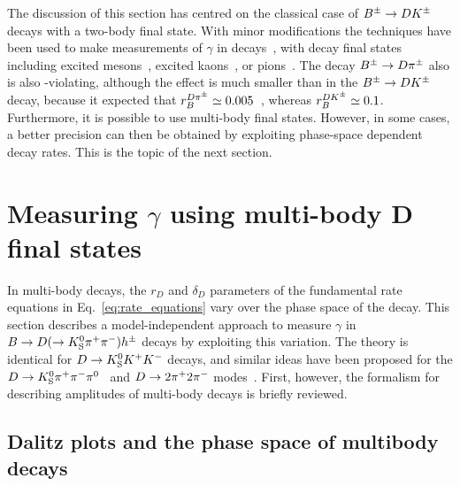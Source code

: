 The discussion of this section has centred on the classical case of ${{B}^\pm}\rightarrow D{{K}^\pm}$ decays with a two-body \D final state. With minor modifications the techniques have been used to make measurements of $\gamma$ in \Bz decays~\cite{altGammeToBeFilledIn}, with \B decay final states including excited \D mesons~\cite{altGammeToBeFilledIn}, excited kaons~\cite{altGammeToBeFilledIn}, or pions~\cite{altGammeToBeFilledIn}. The decay ${{B}^\pm}\rightarrow D {{\pi}^\pm}$ also is also \CP-violating, although the effect is much smaller than in the ${{B}^\pm}\rightarrow D{{K}^\pm}$ decay, because it expected that $r_B^{D\pi^\pm}\simeq 0.005$~\cite{kenzieEstimatingEnsuremathPi2016}, whereas $r_B^{{{D}{{K}^\pm}}}\simeq 0.1$. Furthermore, it is possible to use multi-body \D final states. However, in some cases, a better precision can then be obtained by exploiting phase-space dependent decay rates. This is the topic of the next section.



\section{\texorpdfstring{Measuring $\gamma$ using multi-body D final states}{Measuring gamma using multi-body D final states}} %
\label{sec:gamma_with_multibody_d_final_states}


In multi-body \D decays, the $r_D$ and $\delta_D$ parameters of the fundamental rate equations in Eq.~\eqref{eq:rate_equations} vary over the phase space of the \D decay. This section describes a model-independent approach to measure $\gamma$ in ${B}\rightarrow{\ensuremath{D}}(\rightarrow{\ensuremath{{K}^0_{\mathrm{S}}}}{\ensuremath{{\pi}^+}}{\ensuremath{{\pi}^-}})h^\pm$ decays by exploiting this variation. The theory is identical for ${D}\rightarrow{\ensuremath{{K}^0_{\mathrm{S}}}}{\ensuremath{{K}^+}}{\ensuremath{{K}^-}}$ decays, and similar ideas have been proposed for the ${D}\rightarrow{\ensuremath{{K}^0_{\mathrm{S}}}}{\ensuremath{{\pi}^+}}{\ensuremath{{\pi}^-}}{\ensuremath{{\pi}^0}}$~\cite{evansImprovedSensitivityCKM2020} and ${D}\rightarrow2{{\pi}^+}2{{\pi}^-}$ modes~\cite{harnewModelindependentDeterminationStrong2018}. First, however, the formalism for describing amplitudes of multi-body decays is briefly reviewed.


\subsection{Dalitz plots and the phase space of multibody decays} %
\label{sub:the_phase_space_of_multibody_decays_and_dalitz_plots}

